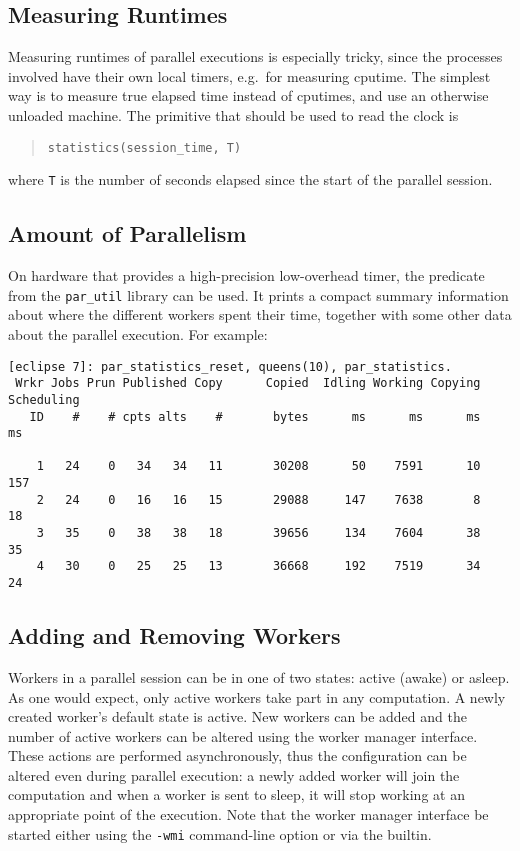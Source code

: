 \subsection{Measuring Runtimes}
Measuring runtimes of parallel executions is especially tricky,
since the processes involved have their own local timers, e.g.\ for
measuring cputime.
The simplest way is to measure true elapsed time instead of cputimes,
and use an otherwise unloaded machine.
The primitive that should be used to read the clock is
\begin{quote}\begin{verbatim}
statistics(session_time, T)
\end{verbatim}\end{quote}
where {\tt T} is the number of seconds elapsed since the start of the parallel
session.

\subsection{Amount of Parallelism}
On hardware that provides a high-precision low-overhead timer,
the predicate  from the {\tt par_util}
library can be used.
It prints a compact summary information about where the different workers
spent their time, together with some other data about the parallel execution.
For example:
\begin{verbatim}
[eclipse 7]: par_statistics_reset, queens(10), par_statistics.
 Wrkr Jobs Prun Published Copy      Copied  Idling Working Copying Scheduling
   ID    #    # cpts alts    #       bytes      ms      ms      ms      ms

    1   24    0   34   34   11       30208      50    7591      10     157
    2   24    0   16   16   15       29088     147    7638       8      18
    3   35    0   38   38   18       39656     134    7604      38      35
    4   30    0   25   25   13       36668     192    7519      34      24
\end{verbatim}

\subsection{Adding and Removing Workers}
Workers in a parallel {\eclipse} session can be in one of two states:
active (awake) or asleep.  As one would expect, only active workers
take part in any computation. A newly created worker's default state
is active. New workers can be added and the number of active workers
can be altered using the worker manager interface. 
These actions are performed asynchronously, thus the configuration
can be altered even during parallel execution: a newly added
worker will join the computation and when a worker is sent to sleep, it
will stop working at an appropriate point of the execution.
Note that the worker manager interface
be started either using the {\tt -wmi} command-line option or via the
 builtin.

